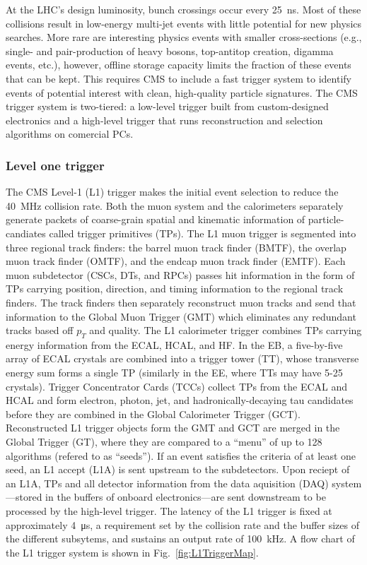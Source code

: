 
At the LHC's design luminosity, bunch crossings occur every \SI{25}{ns}. Most of these collisions result in low-energy multi-jet events with little potential for new physics searches. More rare are interesting physics events with smaller cross-sections (e.g., single- and pair-production of heavy bosons, top-antitop creation, digamma events, etc.), however, offline storage capacity limits the fraction of these events that can be kept. This requires CMS to include a fast trigger system \cite{Trigger} to identify events of potential interest with clean, high-quality particle signatures. The CMS trigger system is two-tiered: a low-level trigger built from custom-designed electronics and a high-level trigger that runs reconstruction and selection algorithms on comercial PCs.

\subsubsection{Level one trigger} \label{sec:L1Trigger}

The CMS Level-1 (L1) trigger makes the initial event selection to reduce the \SI{40}{MHz} collision rate. Both the muon system and the calorimeters separately generate packets of coarse-grain spatial and kinematic information of particle-candiates called trigger primitives (TPs). The L1 muon trigger is segmented into three regional track finders: the barrel muon track finder (BMTF), the overlap muon track finder (OMTF), and the endcap muon track finder (EMTF). Each muon subdetector (CSCs, DTs, and RPCs) passes hit information in the form of TPs carrying position, direction, and timing information to the regional track finders. The track finders then  separately reconstruct muon tracks and send that information to the Global Muon Trigger (GMT) which eliminates any redundant tracks based off $p_T$ and quality. The L1 calorimeter trigger combines TPs carrying energy information from the ECAL, HCAL, and HF. In the EB, a five-by-five array of ECAL crystals are combined into a trigger tower (TT), whose transverse energy sum forms a single TP (similarly in the EE, where TTs may have 5-25 crystals). Trigger Concentrator Cards (TCCs) collect TPs from the ECAL and HCAL and form electron, photon, jet, and hadronically-decaying tau candidates before they are combined in the Global Calorimeter Trigger (GCT). Reconstructed L1 trigger objects form the GMT and GCT are merged in the Global Trigger (GT), where they are compared to a ``menu'' of up to 128 algorithms (refered to as ``seeds''). If an event satisfies the criteria of at least one seed, an L1 accept (L1A) is sent upstream to the subdetectors. Upon reciept of an L1A, TPs and all detector information from the data aquisition (DAQ) system---stored in the buffers of onboard electronics---are sent downstream to be processed by the high-level trigger. The latency of the L1 trigger is fixed at approximately \SI{4}{\micro s}, a requirement set by the collision rate and the buffer sizes of the different subsytems, and sustains an output rate of \SI{100}{kHz}. A flow chart of the L1 trigger system is shown in Fig.~\ref{fig:L1TriggerMap}.

